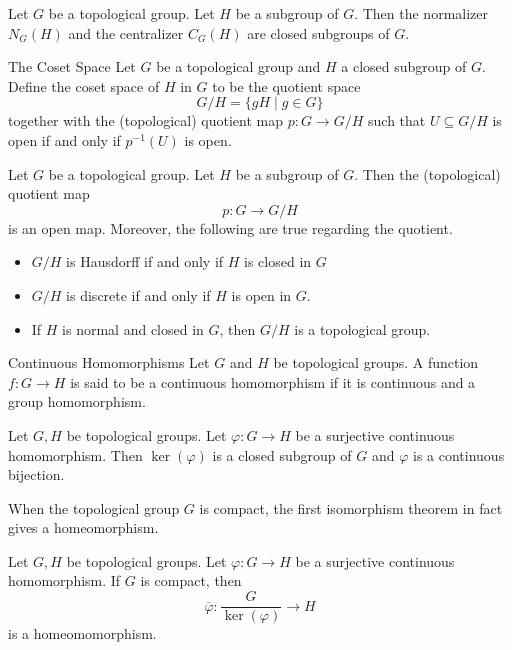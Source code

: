 \documentclass[a4paper]{article}
\begin{document}
\begin{prp}{}{} Let $G$ be a topological group. Let $H$ be a subgroup of $G$. Then the normalizer $N_G(H)$ and the centralizer $C_G(H)$ are closed subgroups of $G$. 
\end{prp}

\begin{defn}{The Coset Space}{} Let $G$ be a topological group and $H$ a closed subgroup of $G$. Define the coset space of $H$ in $G$ to be the quotient space $$G/H=\{gH\;|\;g\in G\}$$ together with the (topological) quotient map $p:G\to G/H$ such that $U\subseteq G/H$ is open if and only if $p^{-1}(U)$ is open. 
\end{defn}

\begin{thm}{}{} Let $G$ be a topological group. Let $H$ be a subgroup of $G$. Then the (topological) quotient map $$p:G\to G/H$$ is an open map. Moreover, the following are true regarding the quotient. 
\begin{itemize}
\item $G/H$ is Hausdorff if and only if $H$ is closed in $G$
\item $G/H$ is discrete if and only if $H$ is open in $G$. 
\item If $H$ is normal and closed in $G$, then $G/H$ is a topological group. 
\end{itemize}
\end{thm}

\begin{defn}{Continuous Homomorphisms}{} Let $G$ and $H$ be topological groups. A function $f:G\to H$ is said to be a continuous homomorphism if it is continuous and a group homomorphism. 
\end{defn}

\begin{prp}{}{} Let $G,H$ be topological groups. Let $\varphi:G\to H$ be a surjective continuous homomorphism. Then $\ker(\varphi)$ is a closed subgroup of $G$ and $\varphi$ is a continuous bijection. 
\end{prp}

When the topological group $G$ is compact, the first isomorphism theorem in fact gives a homeomorphism. 

\begin{prp}{}{} Let $G,H$ be topological groups. Let $\varphi:G\to H$ be a surjective continuous homomorphism. If $G$ is compact, then $$\overline{\varphi}:\frac{G}{\ker(\varphi)}\to H$$ is a homeomomorphism. 
\end{prp}
\end{document}
